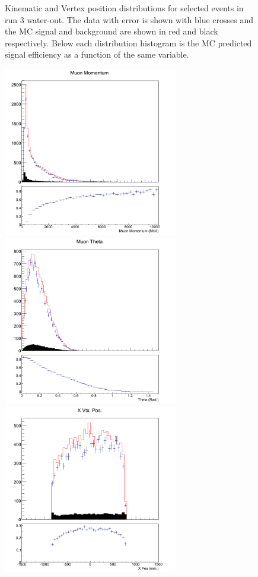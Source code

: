 \begin{figure}[h]
\caption{Kinematic and Vertex position distributions for selected events in run 3 water-out. The data with error is shown with blue crosses and the MC signal and background are shown in red and black respectively. Below each distribution histogram is the MC predicted signal efficiency as a function of the same variable.}
\label{fig:xs2run3air}
\end{figure}

\begin{figure}[h]
\centering
\includegraphics[width=3in]{Figures/TN100Plots/c_Pair_4.png}
\includegraphics[width=3in]{Figures/TN100Plots/c_Thair_4.png}
\includegraphics[width=3in]{Figures/TN100Plots/c_Xair_4.png}

\end{figure}
